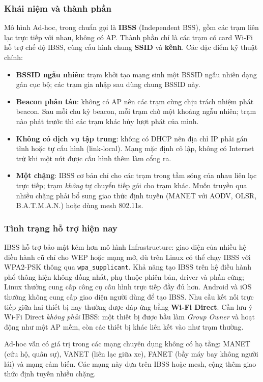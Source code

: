 \documentclass[12pt,a4paper]{article}
\numberwithin{figure}{section}
\numberwithin{table}{section}
\newcommand{\mono}[1]{\texttt{#1}}
\begin{document}
\subsubsection{Khái niệm và thành phần}
Mô hình Ad-hoc, trong chuẩn gọi là \textbf{IBSS} (Independent BSS), gồm các
trạm liên lạc trực tiếp với nhau, không có AP. Thành phần chỉ là các trạm có
card Wi-Fi hỗ trợ chế độ IBSS, cùng cấu hình chung \textbf{SSID} và
\textbf{kênh}. Các đặc điểm kỹ thuật chính:
\begin{itemize}
  \item \textbf{BSSID ngẫu nhiên}: trạm khởi tạo mạng sinh một BSSID ngẫu
    nhiên dạng gán cục bộ; các trạm gia nhập sau dùng chung BSSID này.
  \item \textbf{Beacon phân tán}: không có AP nên các trạm cùng chịu trách
    nhiệm phát beacon. Sau mỗi chu kỳ beacon, mỗi trạm chờ một khoảng ngẫu
    nhiên; trạm nào phát trước thì các trạm khác hủy lượt phát của mình.
  \item \textbf{Không có dịch vụ tập trung}: không có DHCP nên địa chỉ IP phải
    gán tĩnh hoặc tự cấu hình (link-local). Mạng mặc định cô lập, không có
    Internet trừ khi một nút được cấu hình thêm làm cổng ra.
  \item \textbf{Một chặng}: IBSS cơ bản chỉ cho các trạm trong tầm sóng của
    nhau liên lạc trực tiếp; trạm \emph{không} tự chuyển tiếp gói cho trạm
    khác. Muốn truyền qua nhiều chặng phải bổ sung giao thức định tuyến
    (MANET với AODV, OLSR, B.A.T.M.A.N.) hoặc dùng mesh 802.11s.
\end{itemize}

\subsubsection{Tình trạng hỗ trợ hiện nay}
IBSS hỗ trợ bảo mật kém hơn mô hình Infrastructure: giao diện của nhiều hệ
điều hành cũ chỉ cho WEP hoặc mạng mở, dù trên Linux có thể chạy IBSS với
WPA2-PSK thông qua \mono{wpa\_supplicant}. Khả năng tạo IBSS trên hệ điều hành phổ thông hiện không đồng nhất, phụ thuộc
phiên bản, driver và phần cứng; Linux thường cung cấp công cụ cấu hình trực
tiếp đầy đủ hơn. Android và iOS thường không cung cấp giao diện người dùng để
tạo IBSS. Nhu cầu kết nối trực tiếp giữa hai thiết bị nay thường được đáp ứng
bằng \textbf{Wi-Fi Direct}. Cần lưu ý Wi-Fi
Direct \emph{không phải} IBSS: một thiết bị được bầu làm \emph{Group Owner} và
hoạt động như một AP mềm, còn các thiết bị khác liên kết vào như trạm thường.

Ad-hoc vẫn có giá trị trong các mạng chuyên dụng không có hạ tầng: MANET (cứu
hộ, quân sự), VANET (liên lạc giữa xe), FANET (bầy máy bay không người lái) và
mạng cảm biến. Các mạng này dựa trên IBSS hoặc mesh, cộng thêm giao thức định
tuyến nhiều chặng.
\end{document}
